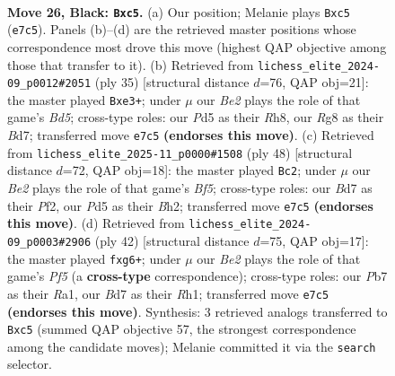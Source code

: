 \documentclass[11pt]{article}
\begin{document}
\clearpage

\begin{figure}[p]\centering
\begin{subfigure}{0.46\textwidth}\centering
\resizebox{\linewidth}{!}{%
\newchessgame
\chessboard[
  setfen={r4kr1/1p1bbp1p/p5p1/2Bp4/8/3K1PN1/PP2B1PP/2R4R b - - 2 26},
  showmover=false,
  pgfstyle=straightmove, color=movearrow, markmove={e7-c5}
]}
\caption{}
\end{subfigure}\hfill
\begin{subfigure}{0.46\textwidth}\centering
\resizebox{\linewidth}{!}{%
\newchessgame
\chessboard[
  setfen={r3k2r/1p1bp2p/p2p1p2/3P4/3b2P1/1P2B3/P1PK1PB1/4R2R b kq - 1 18},
  showmover=false,
  pgfstyle=straightmove, color=movearrow, markmove={d4-e3}
]}
\caption{}
\end{subfigure}
\\[4pt]
\begin{subfigure}{0.46\textwidth}\centering
\resizebox{\linewidth}{!}{%
\newchessgame
\chessboard[
  setfen={3r1rk1/pp5p/2n2pp1/5B2/2bP4/P1P4P/5PPB/R2R2K1 w - - 0 25},
  showmover=false,
  pgfstyle=straightmove, color=movearrow, markmove={f5-c2}
]}
\caption{}
\end{subfigure}\hfill
\begin{subfigure}{0.46\textwidth}\centering
\resizebox{\linewidth}{!}{%
\newchessgame
\chessboard[
  setfen={r6r/ppp2kp1/2n3b1/4pP2/8/4B2P/PPP2KP1/R6R w - - 0 22},
  showmover=false,
  pgfstyle=straightmove, color=movearrow, markmove={f5-g6}
]}
\caption{}
\end{subfigure}
\caption{\textbf{Move 26, Black: \texttt{Bxc5}.} (a) Our position; Melanie plays \texttt{Bxc5} (\texttt{e7c5}). Panels (b)--(d) are the retrieved master positions whose correspondence most drove this move (highest QAP objective among those that transfer to it). (b) Retrieved from \texttt{lichess\_elite\_2024-09\_p0012\#2051} (ply 35) [structural distance $d$=76, QAP obj=21]: the master played \texttt{Bxe3+}; under $\mu$ our \emph{Be2} plays the role of that game's \emph{Bd5}; cross-type roles: our \emph{P}d5 as their \emph{R}h8, our \emph{R}g8 as their \emph{B}d7; transferred move \texttt{e7c5} \textbf{(endorses this move)}. (c) Retrieved from \texttt{lichess\_elite\_2025-11\_p0000\#1508} (ply 48) [structural distance $d$=72, QAP obj=18]: the master played \texttt{Bc2}; under $\mu$ our \emph{Be2} plays the role of that game's \emph{Bf5}; cross-type roles: our \emph{B}d7 as their \emph{P}f2, our \emph{P}d5 as their \emph{B}h2; transferred move \texttt{e7c5} \textbf{(endorses this move)}. (d) Retrieved from \texttt{lichess\_elite\_2024-09\_p0003\#2906} (ply 42) [structural distance $d$=75, QAP obj=17]: the master played \texttt{fxg6+}; under $\mu$ our \emph{Be2} plays the role of that game's \emph{Pf5} (a \textbf{cross-type} correspondence); cross-type roles: our \emph{P}b7 as their \emph{R}a1, our \emph{B}d7 as their \emph{R}h1; transferred move \texttt{e7c5} \textbf{(endorses this move)}. Synthesis: 3 retrieved analogs transferred to \texttt{Bxc5} (summed QAP objective 57, the strongest correspondence among the candidate moves); Melanie committed it via the \texttt{search} selector.}
\label{fig:thought-m51}
\end{figure}
\end{document}
